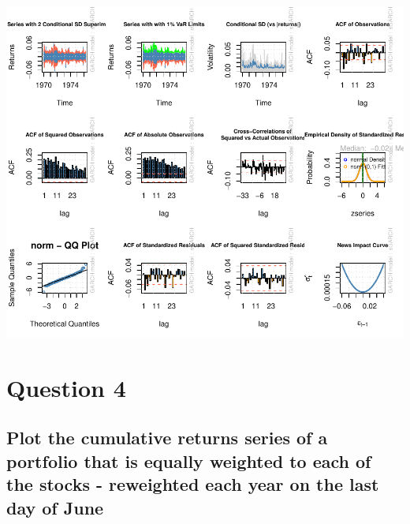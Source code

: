 \documentclass[11pt,preprint, authoryear]{elsarticle}
\let\origfigure\figure
\let\endorigfigure\endfigure
\renewenvironment{figure}[1][2] {
    \expandafter\origfigure\expandafter[H]
} {
    \endorigfigure
}
\numberwithin{equation}{section}
\numberwithin{figure}{section}
\numberwithin{table}{section}
\begin{document}
\begin{figure}[H]

{\centering \includegraphics{Lisa_Tutorial_files/figure-latex/figure1-1} 

}

\caption{GARCH Univariate Plot \label{plot1}}\label{fig:figure1}
\end{figure}

\section{\texorpdfstring{Question 4
\label{Q4}}{Question 4 }}\label{question-4}

\subsection{Plot the cumulative returns series of a portfolio that is
equally weighted to each of the stocks - reweighted each year on the
last day of
June}\label{plot-the-cumulative-returns-series-of-a-portfolio-that-is-equally-weighted-to-each-of-the-stocks---reweighted-each-year-on-the-last-day-of-june}
\end{document}
